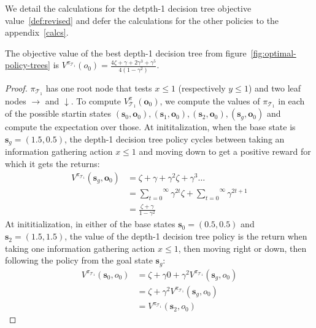 We detail the calculations for the detpth-1 decision tree objective value~\ref{def:revised} and defer the calculations for the other policies to the appendix~\ref{calcs}.

\begin{proposition} The objective value of the best depth-1 decision tree from figure~\ref{fig:optimal-policy-trees} is $V^{\pi_{\mathcal{T}_1}}(o_0) = \frac{4\zeta + \gamma + 2\gamma^3 + \gamma^5}{4(1-\gamma^2)}$.
\end{proposition}

\begin{proof} $\pi_{\mathcal{T}_1}$ has one root node that tests $x\leq1$ (respectively $y\leq1$) and two leaf nodes $\rightarrow$ and $\downarrow$. 
To compute $V^\pi_{\mathcal{T}_1}(\boldsymbol{o}_0)$, we compute the values of $\pi_{\mathcal{T}_1}$ in each of the possible startin states $(\boldsymbol{s}_0, \boldsymbol{o}_0), (\boldsymbol{s}_1, \boldsymbol{o}_0), (\boldsymbol{s}_2, \boldsymbol{o}_0), (\boldsymbol{s}_g, \boldsymbol{o}_0)$ and compute the expectation over those. 
At inititalization, when the base state is $\boldsymbol{s}_g = (1.5, 0.5)$, the depth-1 decision tree policy cycles between taking an information gathering action $x\leq1$ and moving down to get a positive reward for which it gets the returns:
\begin{align*}
    V^{\pi_{\mathcal{T}_1}} (\boldsymbol{s}_g, \boldsymbol{o}_0) &= \zeta + \gamma + \gamma^2 \zeta + \gamma^3 \dots \\
    &= \overset{\infty}{\underset{t=0}\sum} \gamma^{2t} \zeta + \overset{\infty}{\underset{t=0}\sum} \gamma^{2t+1} \\
    &= \frac{\zeta + \gamma}{1 - \gamma^2}
\end{align*}
At inititialization, in either of the base states $\boldsymbol{s}_0=(0.5,0.5)$ and $\boldsymbol{s}_2=(1.5, 1.5)$, the value of the depth-1 decision tree policy is the return when taking one information gathering action $x\leq1$, then moving right or down, then following the policy from the goal state $\boldsymbol{s}_g$:
\begin{align*}
    V^{\pi_{\mathcal{T}_1}} (\boldsymbol{s}_0, o_0) &= \zeta + \gamma 0 + \gamma^2 V^{\pi_{\mathcal{T}_1}} (\boldsymbol{s}_g, o_0) \\
    &= \zeta + \gamma^2 V^{\pi_{\mathcal{T}_1}} (\boldsymbol{s}_g, o_0) \\
    &= V^{\pi_{\mathcal{T}_1}} (\boldsymbol{s}_2, o_0)
\end{align*}

\end{proof}
